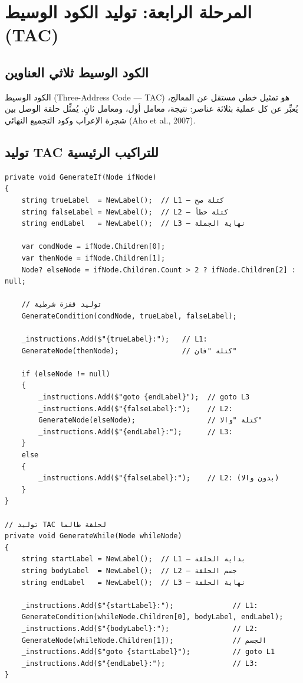 \documentclass[12pt,a4paper]{report}
\newcommand{\filename}[1]{\textcolor{SecondaryBlue}{\texttt{#1}}}
\begin{document}
\chapter{المرحلة الرابعة: توليد الكود الوسيط (TAC)}

\section{الكود الوسيط ثلاثي العناوين}

الكود الوسيط (Three-Address Code — TAC) هو تمثيل خطي مستقل عن المعالج، يُعبِّر عن كل عملية بثلاثة عناصر: نتيجة، معامل أول، ومعامل ثانٍ. يُمثِّل حلقة الوصل بين شجرة الإعراب وكود التجميع النهائي (Aho et al., 2007).

\section{توليد TAC للتراكيب الرئيسية}

\begin{CodeBox}[title={\filename{ICG.cs} — توليد TAC للجملة الشرطية}]
\begin{lstlisting}[style=CSharpStyle]
private void GenerateIf(Node ifNode)
{
    string trueLabel  = NewLabel();  // L1 — كتلة صح
    string falseLabel = NewLabel();  // L2 — كتلة خطأ
    string endLabel   = NewLabel();  // L3 — نهاية الجملة

    var condNode = ifNode.Children[0];
    var thenNode = ifNode.Children[1];
    Node? elseNode = ifNode.Children.Count > 2 ? ifNode.Children[2] : null;

    // توليد قفزة شرطية
    GenerateCondition(condNode, trueLabel, falseLabel);

    _instructions.Add($"{trueLabel}:");   // L1:
    GenerateNode(thenNode);               // كتلة "فان"

    if (elseNode != null)
    {
        _instructions.Add($"goto {endLabel}");  // goto L3
        _instructions.Add($"{falseLabel}:");    // L2:
        GenerateNode(elseNode);                 // كتلة "والا"
        _instructions.Add($"{endLabel}:");      // L3:
    }
    else
    {
        _instructions.Add($"{falseLabel}:");    // L2: (بدون والا)
    }
}

// توليد TAC لحلقة طالما
private void GenerateWhile(Node whileNode)
{
    string startLabel = NewLabel();  // L1 — بداية الحلقة
    string bodyLabel  = NewLabel();  // L2 — جسم الحلقة
    string endLabel   = NewLabel();  // L3 — نهاية الحلقة

    _instructions.Add($"{startLabel}:");              // L1:
    GenerateCondition(whileNode.Children[0], bodyLabel, endLabel);
    _instructions.Add($"{bodyLabel}:");               // L2:
    GenerateNode(whileNode.Children[1]);              // الجسم
    _instructions.Add($"goto {startLabel}");          // goto L1
    _instructions.Add($"{endLabel}:");                // L3:
}
\end{lstlisting}
\end{CodeBox}
\end{document}
